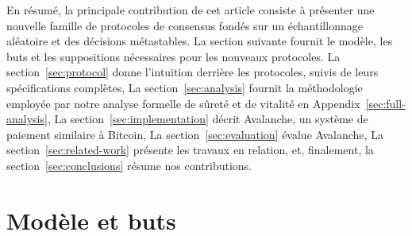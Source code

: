 \documentclass[letterpaper,twocolumn,10pt]{article}
\newcommand{\editchange}[1]{{\color{orange}#1}}
\theoremstyle{definition}
\begin{document}
En résumé, la principale contribution de cet article consiste à présenter une nouvelle famille de protocoles de consensus fondés sur un échantillonnage aléatoire et des décisions métastables.
La section suivante fournit le modèle, les buts et les suppositions nécessaires pour les nouveaux protocoles.
La section~\ref{sec:protocol} donne l'intuition derrière les protocoles, suivis de leurs spécifications complètes,
La section~\ref{sec:analysis} fournit la méthodologie employée par notre analyse formelle de sûreté et de vitalité en Appendix~\ref{sec:full-analysis},
La section~\ref{sec:implementation} décrit Avalanche, un système de paiement similaire à Bitcoin,
La section~\ref{sec:evaluation} évalue Avalanche,
La section~\ref{sec:related-work} présente les travaux en relation, et, finalement, la section~\ref{sec:conclusions} résume nos contributions.

\section{Modèle et buts}
\label{sec:model_and_goals}
\end{document}
